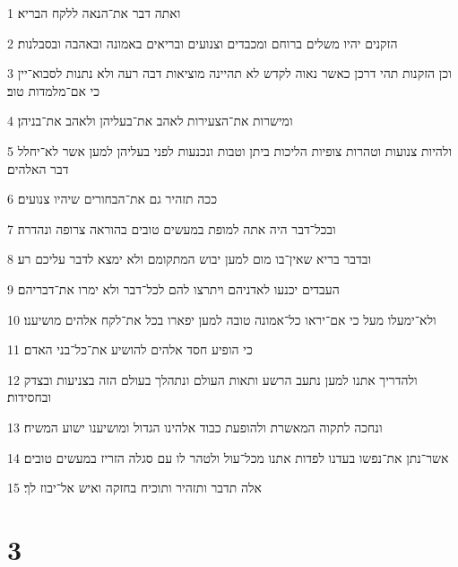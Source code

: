 \par 1 ואתה דבר את־הנאה ללקח הבריא׃
\par 2 הזקנים יהיו משלים ברוחם ומכבדים וצנועים ובריאים באמונה ובאהבה ובסבלנות׃
\par 3 וכן הזקנות תהי דרכן כאשר נאוה לקדש לא תהיינה מוציאות דבה רעה ולא נתנות לסבוא־יין כי אם־מלמדות טוב׃
\par 4 ומישרות את־הצעירות לאהב את־בעליהן ולאהב את־בניהן׃
\par 5 ולהיות צנועות וטהרות צופיות הליכות ביתן וטבות ונכנעות לפני בעליהן למען אשר לא־יחלל דבר האלהים׃
\par 6 ככה תזהיר גם את־הבחורים שיהיו צנועים׃
\par 7 ובכל־דבר היה אתה למופת במעשים טובים בהוראה צרופה ונהדרה׃
\par 8 ובדבר בריא שאין־בו מום למען יבוש המתקומם ולא ימצא לדבר עליכם רע׃
\par 9 העבדים יכנעו לאדניהם ויתרצו להם לכל־דבר ולא ימרו את־דבריהם׃
\par 10 ולא־ימעלו מעל כי אם־יראו כל־אמונה טובה למען יפארו בכל את־לקח אלהים מושיענו׃
\par 11 כי הופיע חסד אלהים להושיע את־כל־בני האדם׃
\par 12 ולהדריך אתנו למען נתעב הרשע ותאות העולם ונתהלך בעולם הזה בצניעות ובצדק ובחסידות׃
\par 13 ונחכה לתקוה המאשרת ולהופעת כבוד אלהינו הגדול ומושיענו ישוע המשיח׃
\par 14 אשר־נתן את־נפשו בעדנו לפדות אתנו מכל־עול ולטהר לו עם סגלה הזריז במעשים טובים׃
\par 15 אלה תדבר ותזהיר ותוכיח בחזקה ואיש אל־יבוז לך׃

\chapter{3}

